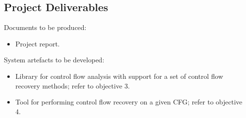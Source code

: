 
\subsection{Project Deliverables}

Documents to be produced:

\begin{itemize}
    \item Project report.
\end{itemize}

System artefacts to be developed:

\begin{itemize}
    \item Library for control flow analysis with support for a set of control flow recovery methods; refer to objective 3.
    \item Tool for performing control flow recovery on a given CFG; refer to objective 4.
\end{itemize}
